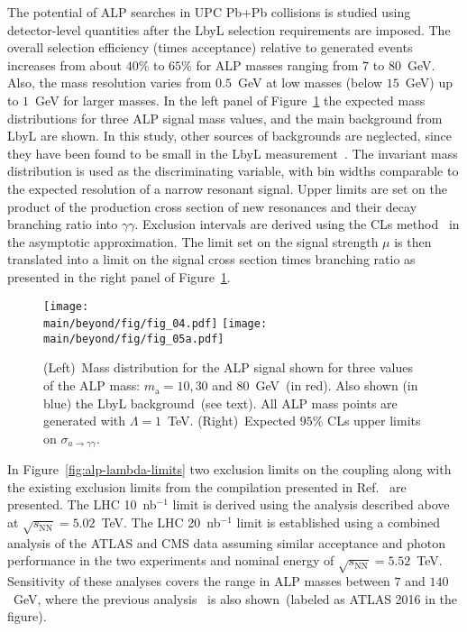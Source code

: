 \documentclass[../report.tex]{subfiles}
\providecommand{\main}{..}
\begin{document}
The potential of ALP searches in UPC Pb+Pb collisions is studied using detector-level quantities after the LbyL selection requirements are imposed. The overall selection efficiency (times acceptance) relative to generated events increases from about $40$\% to $65$\% for ALP masses ranging from $7$ to $80$~GeV. Also, the mass resolution varies from $0.5$~GeV at low masses (below $15$~GeV) up to $1$~GeV for larger masses. In the left panel of Figure~\ref{fig:alp} the expected mass distributions for three ALP signal mass values, and the main background from LbyL are shown. In this study, other sources of backgrounds are neglected, since they have been found to be small in the LbyL measurement~\cite{Aaboud:2017bwk}. The invariant mass distribution is used as the discriminating variable, with bin widths comparable to the expected resolution of a narrow resonant signal.
Upper limits are set on the product of the production cross section of
new resonances and their decay branching ratio into $\gamma
\gamma$. Exclusion intervals are derived using the CLs method~\cite{Read:2002hq} in the asymptotic approximation. The limit set on the signal strength $\mu$ is then translated into a limit on the signal cross section times branching ratio as presented in the right panel of Figure~\ref{fig:alp}.
\begin{figure}[!htbp]
\centering
  \texttt{[image: \\main/beyond/fig/fig\_04.pdf]}
  \texttt{[image: \\main/beyond/fig/fig\_05a.pdf]}
  \caption{(Left)~Mass distribution for the ALP signal
  shown for three values of the ALP mass: $m_\mathrm{a}=10, 30$ and
  $80$~GeV~(in red). Also shown (in blue) the LbyL background~(see
  text). All ALP mass points are generated with $\Lambda = 1$~TeV.
  (Right)~Expected $95$\% CLs upper limits on $\sigma_{a\rightarrow \gamma \gamma}$.}
  \label{fig:alp}
\end{figure}

In Figure~\ref{fig:alp-lambda-limits} two exclusion limits on the coupling along with the existing exclusion limits from the compilation presented in Ref.~\cite{Baldenegro:2018hng} are presented. The LHC 10~nb$^{-1}$ limit is derived using the analysis described above at $\sqrt{s_{\mathrm{NN}}}=5.02$~TeV. The LHC 20~nb$^{-1}$ limit is established using a combined analysis of the ATLAS and CMS data assuming similar acceptance and photon performance in the two experiments and nominal energy of $\sqrt{s_{\mathrm{NN}}}=5.52$~TeV.
Sensitivity of these analyses covers the range in ALP masses between $7$ and $140$~GeV, where the previous analysis~\cite{Knapen:2016moh} is also shown~(labeled as ATLAS 2016 in the figure).
\end{document}
